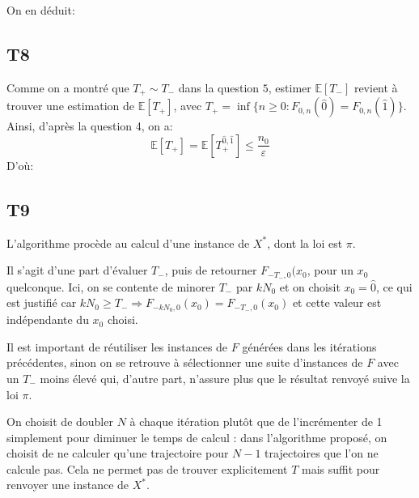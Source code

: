 \documentclass[a4paper,11pt]{article}
\def \esp{\mathbb{E}}
\begin{document}
On en déduit:
\begin{center}
\end{center}

\subsection*{T8}
Comme on a montré que $T_+ \sim T_-$ dans la question $5$, estimer $\mathbb{E}[T_-]$ revient à trouver une estimation de $\mathbb{E}[T_+]$, avec $T_+=\inf\{n\geq 0: F_{0,n}(\hat{0})=F_{0,n}(\hat{1})\}$.\\
Ainsi, d'après la question 4, on a:
\[\esp[T_+]=\esp[T_+^{\hat{0},\hat{1}}]\leq \frac{n_0}{\varepsilon}\] 
D'où:
\begin{center}
\fbox{\begin{minipage}{0.5\textwidth}
\[\esp[T_-]\leq \frac{n_0}{\varepsilon}\] 
\end{minipage}}
\end{center}

\subsection*{T9}
L'algorithme procède au calcul d'une instance de $X^*$, dont la loi est $\pi$. 

Il s'agit d'une part d'évaluer $T_-$, puis de retourner $F_{-T_-,0}(x_0$, pour un $x_0$ quelconque. Ici, on se contente de minorer $T_-$ par $kN_0$ et on choisit $x_0 = \hat{0}$, ce qui est justifié car $kN_0 \ge T_- \Rightarrow F_{-kN_0,0}(x_0) = F_{-T_-,0}(x_0)$ et cette valeur est indépendante du $x_0$ choisi.

Il est important de réutiliser les instances de $F$ générées dans les itérations précédentes, sinon on se retrouve à sélectionner une suite d'instances de $F$ avec un $T_-$ moins élevé qui, d'autre part, n'assure plus que le résultat renvoyé suive la loi $\pi$.

On choisit de doubler $N$ à chaque itération plutôt que de l'incrémenter de 1 simplement pour diminuer le temps de calcul : dans l'algorithme proposé, on choisit de ne calculer qu'une trajectoire pour $N-1$ trajectoires que l'on ne calcule pas. Cela ne permet pas de trouver explicitement $T$ mais suffit pour renvoyer une instance de $X^*$.
\end{document}
